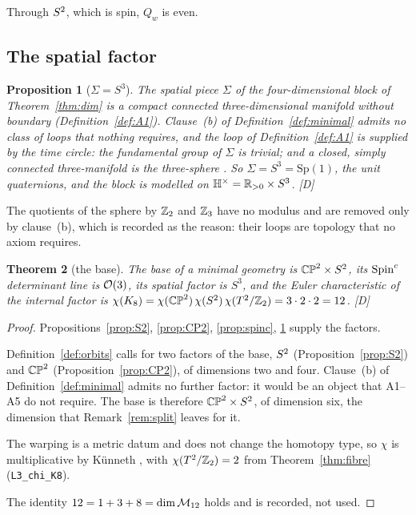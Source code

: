 \documentclass[11pt,a4paper]{article}
\theoremstyle{plain}
\newtheorem{theorem}{Theorem}[section]
\newtheorem{proposition}[theorem]{Proposition}
\theoremstyle{definition}
\theoremstyle{remark}
\newcommand{\Hquat}{\mathbb{H}}
\newcommand{\rigD}{[\textup{D}]}
\begin{document}
Through $S^2$, which is spin, $Q_{w}$ is even.

\subsection{The spatial factor}

\begin{proposition}[$\Sigma=S^{3}$]\label{prop:S3}
The spatial piece $\Sigma$ of the four-dimensional block of Theorem~\ref{thm:dim} is a compact connected three-dimensional manifold without boundary (Definition~\ref{def:A1}). Clause~(b) of Definition~\ref{def:minimal} admits no class of loops that nothing requires, and the loop of Definition~\ref{def:A1} is supplied by the time circle: the fundamental group of $\Sigma$ is trivial; and a closed, simply connected three-manifold is the three-sphere \cite{MorganTian}. So $\Sigma=S^{3}=\mathrm{Sp}(1)$, the unit quaternions, and the block is modelled on $\Hquat^{\times}=\R_{>0}\times S^{3}$. \rigD
\end{proposition}

The quotients of the sphere by $\mathbb{Z}_{2}$ and $\mathbb{Z}_{3}$ have no modulus and are removed only by clause~(b), which is recorded as the reason: their loops are topology that no axiom requires.

\begin{theorem}[the base]\label{thm:base}
The base of a minimal geometry is $\mathbb{CP}^2\times S^2$, its $\text{Spin}^c$ determinant line is $\mathcal{O}(3)$, its spatial factor is $S^{3}$, and the Euler characteristic of the internal factor is $\chi(K_8)=\chi(\mathbb{CP}^2)\,\chi(S^2)\,\chi(T^2/\mathbb{Z}_2)=3\cdot2\cdot2=12$. \rigD
\end{theorem}

\begin{proof}
Propositions~\ref{prop:S2}, \ref{prop:CP2}, \ref{prop:spinc}, \ref{prop:S3} supply the factors.

Definition~\ref{def:orbits} calls for two factors of the base, $S^2$ (Proposition~\ref{prop:S2}) and $\mathbb{CP}^2$ (Proposition~\ref{prop:CP2}), of dimensions two and four. Clause~(b) of Definition~\ref{def:minimal} admits no further factor: it would be an object that A1--A5 do not require. The base is therefore $\mathbb{CP}^2\times S^2$, of dimension six, the dimension that Remark~\ref{rem:split} leaves for it.

The warping is a metric datum and does not change the homotopy type, so $\chi$ is multiplicative by K\"unneth \cite{Hatcher}, with $\chi(T^2/\mathbb{Z}_2)=2$ from Theorem~\ref{thm:fibre} (\texttt{L3\_chi\_K8}).

The identity $12=1+3+8=\dim\mathcal{M}_{12}$ holds and is recorded, not used.
\end{proof}
\end{document}
